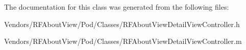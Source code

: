 The documentation for this class was generated from the following files\+:\begin{DoxyCompactItemize}
\item 
Vendors/\+R\+F\+About\+View/\+Pod/\+Classes/R\+F\+About\+View\+Detail\+View\+Controller.\+h\item 
Vendors/\+R\+F\+About\+View/\+Pod/\+Classes/R\+F\+About\+View\+Detail\+View\+Controller.\+m\end{DoxyCompactItemize}
